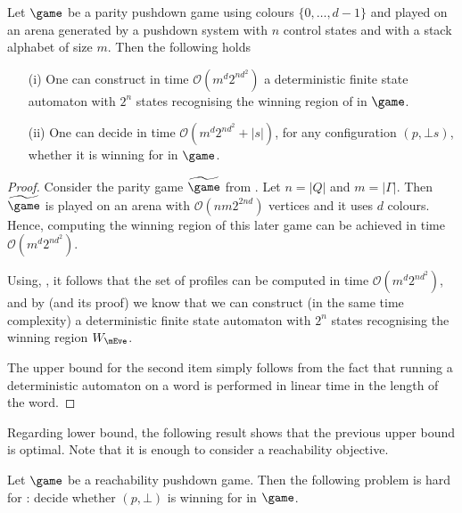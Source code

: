 \begin{theorem}\label{10-thm:solving-upper-bound}
	Let $\game$ be a parity pushdown game using colours $\{0,\dots,d-1\}$ and played on an arena generated by a pushdown system with $n$ control states and with a stack alphabet of size $m$. Then the following holds
	\begin{enumerate}
		\item[(i)] One can construct in time $\mathcal{O}(m^d 2^{nd^2})$ a deterministic finite state automaton with $2^n$ states recognising the winning region of \Eve in $\game$.
		\item[(ii)] One can decide in time $\mathcal{O}(m^d 2^{nd^2}+|s|)$, for any configuration $(p,\bot s)$, whether it is winning for \Eve in $\game$. 
	\end{enumerate}
\end{theorem}


\begin{proof}
	Consider the parity game $\fgame$ from . Let $n=|Q|$ and $m=|\Gamma|$. Then $\fgame$ is played on an arena with $\mathcal{O}(n m 2^{2nd})$ vertices and it uses $d$ colours. Hence, computing the winning region of this later game can be achieved in time $\mathcal{O}(m^d 2^{nd^2})$.
	
	Using, , it follows that the set of profiles can be computed in time $\mathcal{O}(m^d 2^{nd^2})$, and by  (and its proof) we know that we can construct (in the same time complexity) a deterministic finite state automaton with $2^n$ states recognising the winning region $W_\mEve$.
	
	The upper bound for the second item simply follows from the fact that running a deterministic automaton on a word is performed in linear time in the length of the word.
\end{proof}

Regarding lower bound, the following result shows that the previous upper bound is optimal. Note that it is enough to consider a reachability objective.

\begin{theorem}\label{10-thm:solving-lower-bound}
	Let $\game$ be a reachability pushdown game. Then the following problem is hard for \EXP: decide whether $(p,\bot)$ is winning for \Eve in $\game$.
\end{theorem}

